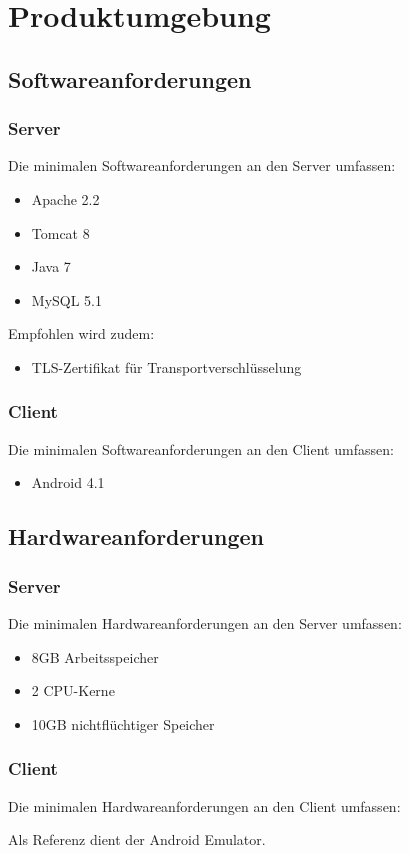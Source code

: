 \section{Produktumgebung}
\subsection{Softwareanforderungen}

\subsubsection{Server}
Die minimalen Softwareanforderungen an den Server umfassen:
\begin{itemize}
\item Apache 2.2
\item Tomcat 8
\item Java 7
\item MySQL 5.1

\end{itemize}

Empfohlen wird zudem:
\begin{itemize}
\item TLS-Zertifikat für Transportverschlüsselung
\end{itemize}

\subsubsection{Client}
Die minimalen Softwareanforderungen an den Client umfassen:
\begin{itemize}
\item Android 4.1

\end{itemize}


\subsection{Hardwareanforderungen}
\subsubsection{Server}
Die minimalen Hardwareanforderungen an den Server umfassen:
\begin{itemize}
\item 8GB Arbeitsspeicher
\item 2 CPU-Kerne
\item 10GB nichtflüchtiger Speicher
\end{itemize}

\subsubsection{Client}
Die minimalen Hardwareanforderungen an den Client umfassen:

Als Referenz dient der Android Emulator.

